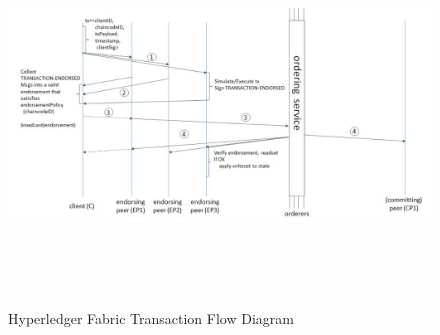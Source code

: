 \begin{figure}[H]
	\includegraphics[width=15cm,height=10cm]{images/transactionflow.jpg}
	\caption{Hyperledger Fabric Transaction Flow Diagram}
	\label{fig:transactionflow}
	\end{figure}

 
 

 
 

 
 





 



 
  